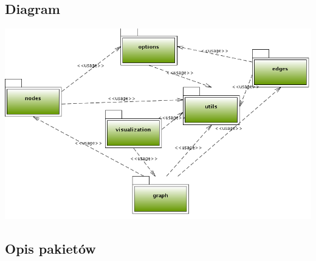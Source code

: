 \documentclass[a4paper,10pt]{article}
\begin{document}
\subsection{Diagram}
 \includegraphics[width=\linewidth]{./modelowanie/OV_UML/PackageDiagram.png}


\subsection{Opis pakietów}
\end{document}

